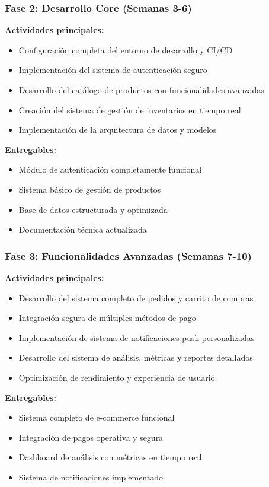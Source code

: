 \documentclass[12pt,a4paper]{report}
\begin{document}
\subsubsection{Fase 2: Desarrollo Core (Semanas 3-6)}
\textbf{Actividades principales:}
\begin{itemize}
	\item Configuración completa del entorno de desarrollo y CI/CD
	\item Implementación del sistema de autenticación seguro
	\item Desarrollo del catálogo de productos con funcionalidades avanzadas
	\item Creación del sistema de gestión de inventarios en tiempo real
	\item Implementación de la arquitectura de datos y modelos
\end{itemize}

\textbf{Entregables:}
\begin{itemize}
	\item Módulo de autenticación completamente funcional
	\item Sistema básico de gestión de productos
	\item Base de datos estructurada y optimizada
	\item Documentación técnica actualizada
\end{itemize}

\subsubsection{Fase 3: Funcionalidades Avanzadas (Semanas 7-10)}
\textbf{Actividades principales:}
\begin{itemize}
	\item Desarrollo del sistema completo de pedidos y carrito de compras
	\item Integración segura de múltiples métodos de pago
	\item Implementación de sistema de notificaciones push personalizadas
	\item Desarrollo del sistema de análisis, métricas y reportes detallados
	\item Optimización de rendimiento y experiencia de usuario
\end{itemize}

\textbf{Entregables:}
\begin{itemize}
	\item Sistema completo de e-commerce funcional
	\item Integración de pagos operativa y segura
	\item Dashboard de análisis con métricas en tiempo real
	\item Sistema de notificaciones implementado
\end{itemize}
\end{document}
